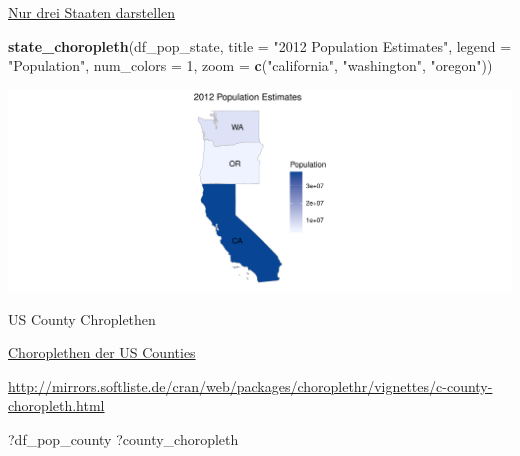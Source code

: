 \documentclass[ignorenonframetext,]{beamer}
\newenvironment{Shaded}{\begin{snugshade}}{\end{snugshade}}
\newcommand{\KeywordTok}[1]{\textcolor[rgb]{0.13,0.29,0.53}{\textbf{#1}}}
\newcommand{\DataTypeTok}[1]{\textcolor[rgb]{0.13,0.29,0.53}{#1}}
\newcommand{\DecValTok}[1]{\textcolor[rgb]{0.00,0.00,0.81}{#1}}
\newcommand{\StringTok}[1]{\textcolor[rgb]{0.31,0.60,0.02}{#1}}
\newcommand{\NormalTok}[1]{#1}
\begin{document}
\begin{frame}[fragile]{\href{http://mirrors.softliste.de/cran/web/packages/choroplethr/vignettes/b-state-choropleth.html}{Nur
drei Staaten darstellen}}

\begin{Shaded}
\begin{Highlighting}[]
\KeywordTok{state_choropleth}\NormalTok{(df_pop_state,}
                 \DataTypeTok{title      =} \StringTok{"2012 Population Estimates"}\NormalTok{,}
                 \DataTypeTok{legend     =} \StringTok{"Population"}\NormalTok{,}
                 \DataTypeTok{num_colors =} \DecValTok{1}\NormalTok{,}
                 \DataTypeTok{zoom       =} \KeywordTok{c}\NormalTok{(}\StringTok{"california"}\NormalTok{, }\StringTok{"washington"}\NormalTok{, }\StringTok{"oregon"}\NormalTok{))}
\end{Highlighting}
\end{Shaded}

\includegraphics{Choroplethen_files/figure-beamer/unnamed-chunk-21-1.pdf}

\end{frame}

\begin{frame}[fragile]{US County Chroplethen}

\href{http://mirrors.softliste.de/cran/web/packages/choroplethr/vignettes/c-county-choropleth.html}{Choroplethen
der US Counties}

\url{http://mirrors.softliste.de/cran/web/packages/choroplethr/vignettes/c-county-choropleth.html}

\begin{Shaded}
\begin{Highlighting}[]
\NormalTok{?df_pop_county}
\NormalTok{?county_choropleth}
\end{Highlighting}
\end{Shaded}

\end{frame}
\end{document}
